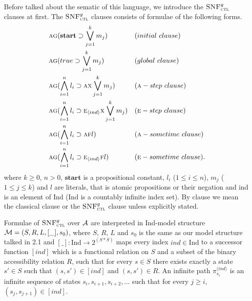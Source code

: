 \documentclass[runningheads]{llncs}
\newcommand{\tuple}[1]{{\langle{#1}\rangle}}
\newcommand{\rto}{\rightarrow}
\newcommand{\Hm} {{\cal M}}
\newcommand{\Ha} {{\cal A}}
\newcommand{\start}{\textbf{start}}
\newcommand{\Ind}{\textrm{Ind}}
\newcommand{\ALL}{\textsc{a}}
\newcommand{\EXIST}{\textsc{e}}
\newcommand{\NEXT}{\textsc{x}}
\newcommand{\FUTURE}{\textsc{f}}
\newcommand{\GLOBAL}{\textsc{g}}
\newcommand{\CTLsnf}{{\textsc{SNF}_{\textsc{ctl}}^g}}
\begin{document}
Before talked about the sematic of this language, we introduce the $\CTLsnf$ clauses at first. The $\CTLsnf$ clauses consists of formulae of the following forms.
\begin{align*}
& \ALL \GLOBAL(\start \supset \bigvee_{j=1}^k m_j) && (initial\ clause) \\
& \ALL \GLOBAL(true \supset \bigvee_{j=1}^k m_j) && (global\ clause) \\
& \ALL \GLOBAL(\bigwedge_{i=1}^n l_i \supset \ALL \NEXT \bigvee_{j=1}^k m_j) && (\ALL-step\ clause)\\
& \ALL \GLOBAL(\bigwedge_{i=1}^n l_i \supset \EXIST_\tuple{ind} \NEXT \bigvee_{j=1}^k m_j) && (\EXIST-step\ clause)\\
& \ALL \GLOBAL(\bigwedge_{i=1}^n l_i \supset \ALL \FUTURE l) && (\ALL-sometime\ clause)\\
& \ALL \GLOBAL(\bigwedge_{i=1}^n l_i \supset \EXIST_{\tuple{ind}} \FUTURE l) && (\EXIST-sometime\ clause).
\end{align*}
where $k \ge 0$, $n > 0$, $\start$ is a propositional constant, $l_i$ ($1 \le i \le n$), $m_j$ ($1 \le j \le k$) and $l$ are literals, that is atomic propositions or their negation and ind is an element of Ind (Ind is a countably infinite index set). By clause we mean the classical clause or the $\CTLsnf$ clause unless explicitly stated.

Formulae of $\CTLsnf$ over $\Ha$ are interpreted in \Ind-model structure $\Hm=(S,R,L, [\_], s_0)$, where $S$, $R$, $L$ and $s_0$ is the same as our model structure talked in 2.1 and $[\_]: \Ind \rto 2^{(S*S)}$ maps every index $ind \in \Ind$ to a successor function $[ind]$ which is a functional relation on $S$ and a subset of the binary accessibility relation $R$, such that for every $s\in S$ there exists exactly a state $s'\in S$ such that $(s,s')\in [ind]$ and $(s,s')\in R$.
An infinite path $\pi_{s_i}^{\tuple{ind}}$ is an infinite sequence of states $s_i, s_{i+1}, s_{i+2},\dots$ such that for every $j\geq i$, $(s_j, s_{j+1})\in [ind]$.
\end{document}
